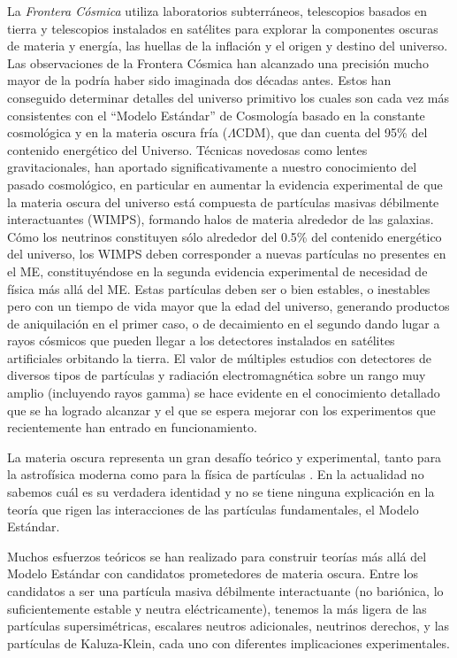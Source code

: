 La \emph{Frontera Cósmica} utiliza laboratorios subterráneos,
telescopios basados en tierra y telescopios instalados en satélites
para explorar la componentes oscuras de materia y energía, las huellas
de la inflación y el origen y destino del universo. Las observaciones
de la Frontera Cósmica han alcanzado una precisión mucho mayor de la
podría haber sido imaginada dos décadas antes. Estos han conseguido
determinar detalles del universo primitivo los cuales son cada vez más
consistentes con el ``Modelo Estándar'' de Cosmología basado en la
constante cosmológica y en la materia oscura fría ($\Lambda$CDM), que
dan cuenta del 95\% del contenido energético del Universo. Técnicas
novedosas como lentes gravitacionales, han aportado significativamente
a nuestro conocimiento del pasado cosmológico, en particular en
aumentar la evidencia experimental de que la materia oscura del
universo está compuesta de partículas masivas débilmente
interactuantes (WIMPS), formando halos de materia alrededor de las
galaxias. Cómo los neutrinos constituyen sólo alrededor del 0.5\% del
contenido energético del universo, los WIMPS deben corresponder a
nuevas partículas no presentes en el ME, constituyéndose en la segunda
evidencia experimental de necesidad de física más allá del ME. Estas
partículas deben ser o bien estables, o inestables pero con un tiempo
de vida mayor que la edad del universo, generando productos de
aniquilación en el primer caso, o de decaimiento en el segundo
dando lugar a rayos cósmicos que pueden llegar a los detectores instalados
en satélites artificiales orbitando la tierra.  El valor de múltiples
estudios con detectores de diversos tipos de partículas y radiación
electromagnética sobre un rango muy amplio (incluyendo rayos gamma) se
hace evidente en el conocimiento detallado que se ha logrado alcanzar
y el que se espera mejorar con los experimentos que recientemente han
entrado en funcionamiento.

La materia oscura representa un gran desafío teórico y experimental,
tanto para la astrofísica moderna como para la física de partículas
\cite{Bertone:2004pz, Amsler:2008zzb, Bertone:2010,Jungman:1995df}. En
la actualidad no sabemos cuál es su verdadera identidad y no se tiene
ninguna explicación en la teoría que rigen las interacciones de las
partículas fundamentales, el Modelo Estándar.

Muchos esfuerzos teóricos se han realizado para construir teorías más
allá del Modelo Estándar con candidatos prometedores de materia
oscura. Entre los candidatos a ser una partícula masiva débilmente
interactuante \cite{Bertone:2004pz,Jungman:1995df} (no bariónica, lo
suficientemente estable y neutra eléctricamente), tenemos la más
ligera de las partículas supersimétricas, escalares neutros
adicionales, neutrinos derechos, y las partículas de Kaluza-Klein,
cada uno con diferentes implicaciones experimentales.

